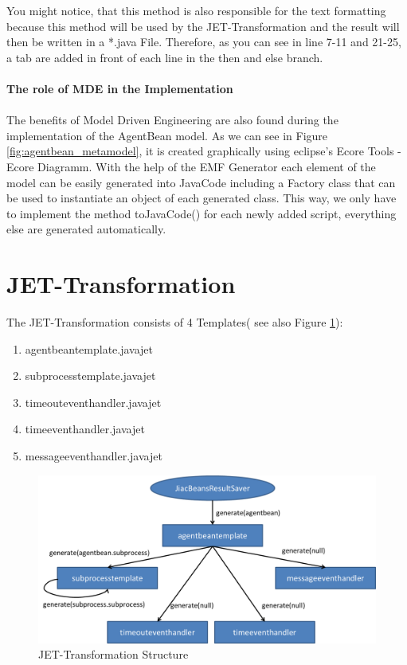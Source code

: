 You might notice, that this method is also responsible for the text formatting because this method will be used by the JET-Transformation and the result will then be written in a *.java File. Therefore, as you can see in line 7-11 and 21-25, a tab are added in front of each line in the then and else branch.\\\\
\textbf{The role of MDE in the Implementation}\\\\
The benefits of Model Driven Engineering are also found during the implementation of the AgentBean model. As we can see in Figure \ref{fig:agentbean_metamodel}, it is created graphically using eclipse's Ecore Tools - Ecore Diagramm. With the help of the EMF Generator each element of the model can be easily generated into JavaCode including a Factory class that can be used to instantiate an object of each generated class. This way, we only have to implement the method toJavaCode() for each newly added script, everything else are generated automatically. 


\section{JET-Transformation}
The JET-Transformation consists of 4 Templates( see also Figure \ref{fig:transformation_structure}): 
\begin{enumerate}
	\item agentbeantemplate.javajet
	\item subprocesstemplate.javajet
	\item timeouteventhandler.javajet
	\item timeeventhandler.javajet
	\item messageeventhandler.javajet
\end{enumerate}

\begin{figure}[h]
	\centering\includegraphics[width=1.0\textwidth]{images/templates_structure.png}
	\caption{JET-Transformation Structure}
	\label{fig:transformation_structure}
\end{figure}

